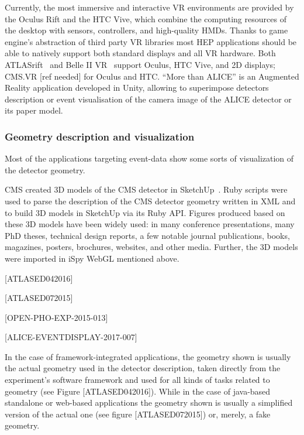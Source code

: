 \documentclass[12pt,a4paper]{article}
\begin{document}
Currently, the most immersive and interactive VR environments are provided by the Oculus Rift and the HTC Vive, which combine the
computing resources of the desktop with sensors, controllers, and high-quality HMDs. Thanks to game engine’s abstraction of third
party VR libraries most HEP applications should be able to natively support both standard displays and all VR hardware.
Both ATLASrift~\cite{ATLASRift} and Belle II VR~\cite{BelleIIVR} support Oculus, HTC Vive, and 2D displays; CMS.VR [ref needed] for
Oculus and HTC. “More than ALICE” is an Augmented Reality application developed in Unity, allowing to superimpose detectors description or event
visualisation of the camera image of the ALICE detector or its paper model.

\hypertarget{geometry-description}{%
\subsubsection{Geometry description and visualization}\label{geometry-description}}

Most of the applications targeting event-data show some sorts of visualization of the detector geometry.

CMS created 3D models of the CMS detector in SketchUp~\cite{CMSSketchUp}. Ruby scripts were used to parse the
description of the CMS detector geometry written in XML and to build 3D models in SketchUp via its Ruby API.
Figures produced based on these 3D models have been widely used: in many conference presentations, many PhD theses,
technical design reports, a few notable journal publications, books, magazines, posters, brochures, websites, and other media.
Further, the 3D models were imported in iSpy WebGL mentioned above.

[ATLASED042016]

[ATLASED072015]

[OPEN-PHO-EXP-2015-013]

[ALICE-EVENTDISPLAY-2017-007]

In the case of framework-integrated applications, the geometry shown is usually the actual geometry used in the detector description,
taken directly from the experiment’s software framework and used for all kinds of tasks related to geometry (see Figure [ATLASED042016]).
While in the case of  java-based standalone or web-based applications the geometry shown is usually a simplified version of the actual one
(see figure [ATLASED072015]) or, merely, a fake geometry.
\end{document}
